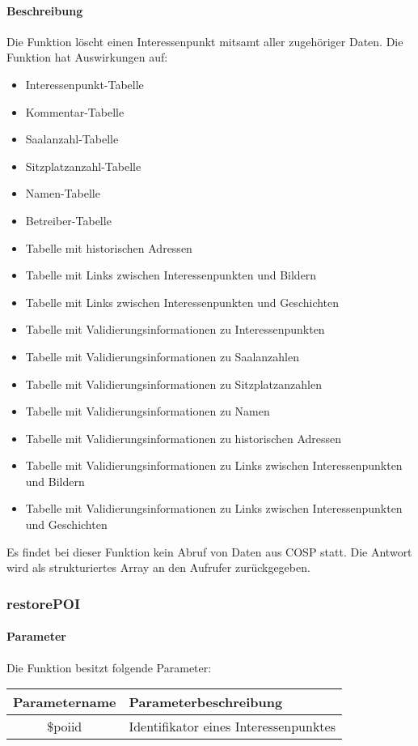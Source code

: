 \paragraph{Beschreibung} Die Funktion löscht einen Interessenpunkt mitsamt aller zugehöriger Daten. Die Funktion hat Auswirkungen auf:
\begin{itemize}
	\item Interessenpunkt-Tabelle
	\item Kommentar-Tabelle
	\item Saalanzahl-Tabelle
	\item Sitzplatzanzahl-Tabelle
	\item Namen-Tabelle
	\item Betreiber-Tabelle
	\item Tabelle mit historischen Adressen
	\item Tabelle mit Links zwischen Interessenpunkten und Bildern
	\item Tabelle mit Links zwischen Interessenpunkten und Geschichten
	\item Tabelle mit Validierungsinformationen zu Interessenpunkten
	\item Tabelle mit Validierungsinformationen zu Saalanzahlen
	\item Tabelle mit Validierungsinformationen zu Sitzplatzanzahlen
	\item Tabelle mit Validierungsinformationen zu Namen
	\item Tabelle mit Validierungsinformationen zu historischen Adressen
	\item Tabelle mit Validierungsinformationen zu Links zwischen Interessenpunkten und Bildern
	\item Tabelle mit Validierungsinformationen zu Links zwischen Interessenpunkten und Geschichten
\end{itemize}
Es findet bei dieser Funktion kein Abruf von Daten aus {\glqq COSP\grqq} statt. Die Antwort wird als strukturiertes Array an den Aufrufer zurückgegeben.
\subsubsection{restorePOI}
\paragraph{Parameter} Die Funktion besitzt folgende Parameter:
\begin{table}[H]
	\begin{tabular}{|c|p{11cm}|}
		\hline
		\textbf{Parametername} & \textbf{Parameterbeschreibung} \\ \hline
		\$poiid     & Identifikator eines Interessenpunktes \\ \hline
	\end{tabular}
\end{table}
